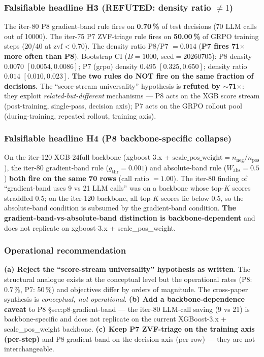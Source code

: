\subsubsection{Falsifiable headline H3 (REFUTED: density ratio $\neq 1$)}
The iter-80 P8 gradient-band rule fires on \textbf{0.70\,\%} of test
decisions (70 LLM calls out of 10000).  The iter-75 P7 ZVF-triage rule
fires on \textbf{50.00\,\%} of GRPO training steps (20/40 at
$\mathrm{zvf}{<}0.70$).  The density ratio P8/P7 $= 0.014$
(\textbf{P7 fires 71$\times$ more often than P8}).  Bootstrap CI
($B{=}1000$, seed$=20260705$): P8 density $0.0070$
$[0.0054, 0.0086]$; P7 (grpo) density $0.495$
$[0.325, 0.650]$; density ratio $0.014$
$[0.010, 0.023]$.  \textbf{The two rules do NOT fire on the same
fraction of decisions.}  The ``score-stream universality'' hypothesis
is \textbf{refuted by $\sim$71$\times$}: they exploit
\emph{related-but-different} mechanisms --- P8 acts on the XGB score
stream (post-training, single-pass, decision axis); P7 acts on the
GRPO rollout pool (during-training, repeated rollout, training axis).

\subsubsection{Falsifiable headline H4 (P8 backbone-specific collapse)}
On the iter-120 XGB-24full backbone (xgboost 3.x +
$\mathrm{scale\_pos\_weight}{=}n_\mathrm{neg}/n_\mathrm{pos}$), the
iter-80 gradient-band rule ($g_\mathrm{thr}{=}0.001$) and
absolute-band rule ($W_\mathrm{abs}{=}0.5$) \textbf{both fire on the
same 70 rows} (call ratio $= 1.00$).  The iter-80 finding of
``gradient-band uses 9 vs 21 LLM calls'' was on a backbone whose
top-$K$ scores straddled 0.5; on the iter-120 backbone, all top-$K$
scores lie below 0.5, so the absolute-band condition is subsumed by
the gradient-band condition.  \textbf{The gradient-band-vs-absolute-band
distinction is backbone-dependent} and does not replicate on
xgboost-3.x + scale\_pos\_weight.

\subsubsection{Operational recommendation}
\textbf{(a) Reject the ``score-stream universality'' hypothesis as written}.
The structural analogue exists at the conceptual level but the
operational rates (P8: 0.7\,\%, P7: 50\,\%) and objectives differ by
orders of magnitude.  The cross-paper synthesis is \emph{conceptual,
not operational}.  \textbf{(b) Add a backbone-dependence caveat} to
P8 \S{sec:p8-gradient-band} --- the iter-80 LLM-call saving
(9 vs 21) is backbone-specific and does not replicate on the
current XGBoost-3.x + scale\_pos\_weight backbone.  \textbf{(c) Keep
P7 ZVF-triage on the training axis (per-step)} and P8 gradient-band on
the decision axis (per-row) --- they are not interchangeable.